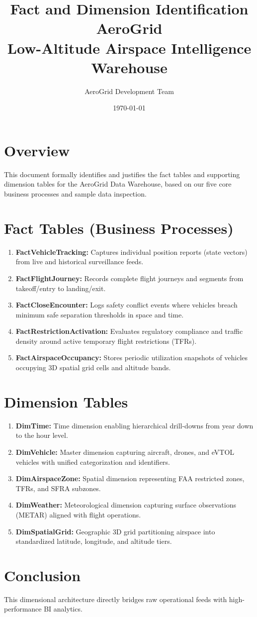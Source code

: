 \documentclass[11pt,a4paper]{article}
\title{\textbf{Fact and Dimension Identification}\\[0.5cm] \textbf{AeroGrid}\\[0.3cm] Low-Altitude Airspace Intelligence Warehouse}
\author{AeroGrid Development Team}
\date{\today}
\begin{document}
\maketitle

\section{Overview}
This document formally identifies and justifies the fact tables and supporting dimension tables for the AeroGrid Data Warehouse, based on our five core business processes and sample data inspection.

\section{Fact Tables (Business Processes)}
\begin{enumerate}
    \item \textbf{FactVehicleTracking:} Captures individual position reports (state vectors) from live and historical surveillance feeds.
    \item \textbf{FactFlightJourney:} Records complete flight journeys and segments from takeoff/entry to landing/exit.
    \item \textbf{FactCloseEncounter:} Logs safety conflict events where vehicles breach minimum safe separation thresholds in space and time.
    \item \textbf{FactRestrictionActivation:} Evaluates regulatory compliance and traffic density around active temporary flight restrictions (TFRs).
    \item \textbf{FactAirspaceOccupancy:} Stores periodic utilization snapshots of vehicles occupying 3D spatial grid cells and altitude bands.
\end{enumerate}

\section{Dimension Tables}
\begin{enumerate}
    \item \textbf{DimTime:} Time dimension enabling hierarchical drill-downs from year down to the hour level.
    \item \textbf{DimVehicle:} Master dimension capturing aircraft, drones, and eVTOL vehicles with unified categorization and identifiers.
    \item \textbf{DimAirspaceZone:} Spatial dimension representing FAA restricted zones, TFRs, and SFRA subzones.
    \item \textbf{DimWeather:} Meteorological dimension capturing surface observations (METAR) aligned with flight operations.
    \item \textbf{DimSpatialGrid:} Geographic 3D grid partitioning airspace into standardized latitude, longitude, and altitude tiers.
\end{enumerate}

\section{Conclusion}
This dimensional architecture directly bridges raw operational feeds with high-performance BI analytics.
\end{document}
